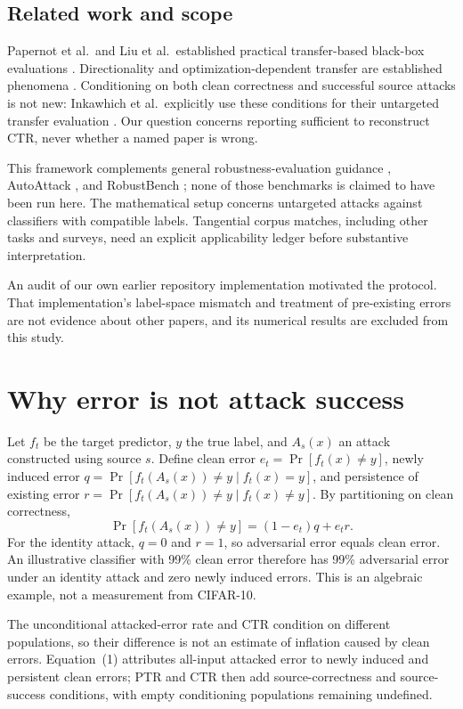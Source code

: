 \documentclass[10pt,twocolumn]{article}
\begin{document}
\subsection{Related work and scope}
\label{sec:background}
Papernot et al.\ and Liu et al.\ established practical transfer-based black-box evaluations \cite{papernot,liu}. Directionality and optimization-dependent transfer are established phenomena \cite{demontis,dong}. Conditioning on both clean correctness and successful source attacks is not new: Inkawhich et al.\ explicitly use these conditions for their untargeted transfer evaluation \cite{inkawhich2019}. Our question concerns reporting sufficient to reconstruct CTR, never whether a named paper is wrong.

This framework complements general robustness-evaluation guidance \cite{carlini2019,tramer2020}, AutoAttack \cite{croce2020}, and RobustBench \cite{robustbench}; none of those benchmarks is claimed to have been run here. The mathematical setup concerns untargeted attacks against classifiers with compatible labels. Tangential corpus matches, including other tasks and surveys, need an explicit applicability ledger before substantive interpretation.

An audit of our own earlier repository implementation motivated the protocol. That implementation's label-space mismatch and treatment of pre-existing errors are not evidence about other papers, and its numerical results are excluded from this study.

\section{Why error is not attack success}
Let $f_t$ be the target predictor, $y$ the true label, and $A_s(x)$ an attack constructed using source $s$. Define clean error $e_t=\Pr[f_t(x)\ne y]$, newly induced error $q=\Pr[f_t(A_s(x))\ne y\mid f_t(x)=y]$, and persistence of existing error $r=\Pr[f_t(A_s(x))\ne y\mid f_t(x)\ne y]$. By partitioning on clean correctness,
\begin{equation}
\Pr[f_t(A_s(x))\ne y]=(1-e_t)q+e_t r.
\end{equation}
For the identity attack, $q=0$ and $r=1$, so adversarial error equals clean error. An illustrative classifier with 99\% clean error therefore has 99\% adversarial error under an identity attack and zero newly induced errors. This is an algebraic example, not a measurement from CIFAR-10.

The unconditional attacked-error rate and CTR condition on different populations, so their difference is not an estimate of inflation caused by clean errors. Equation~(1) attributes all-input attacked error to newly induced and persistent clean errors; PTR and CTR then add source-correctness and source-success conditions, with empty conditioning populations remaining undefined.
\end{document}
